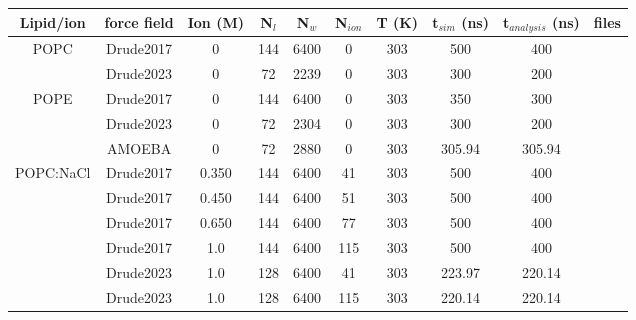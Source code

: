 \documentclass[journal=jacsat,manuscript=article,layout=singlecolumn]{achemso}
\begin{document}
\newpage
\begin{table}[]
\begin{small}
\begin{tabular}{cccccccccc}
	Lipid/ion                & force field  & Ion (M) & N$_{l}$ & N$_{w}$ & N$_{ion}$ & T (K) & t$_{sim}$ (ns) & t$_{analysis}$ (ns) & files \\ \hline
\multirow{2}{*}{POPC}            & Drude2017 & 0      & 144       & 6400       & 0         & 303    & 500              & 400         &          \cite{kav_batuhan_2021_7607436}    \\ 
                                 & Drude2023 & 0      & 72       & 2239       & 0         & 303      & 300              & 200         &          \cite{kav_batuhan_2023_7916287, richard_m_venable_2023_7871949}    \\ \hline
\multirow{3}{*}{POPE}                              & Drude2017 & 0      & 144       & 6400       & 0         & 303    & 350              & 300         &          \cite{kav_batuhan_2021_7604627}    \\                                            & Drude2023 & 0       & 72        & 2304      &  0         & 303    & 300             & 200         &           \cite{richard_m_venable_2023_7872447,kav_batuhan_2023_7916494} \\
                                                  & AMOEBA     & 0       & 72        & 2880      &  0        & 303     & 305.94          & 305.94      & \cite{kav_batuhan_2023_7622838} \\ \hline
	\multirow{5}{*}{POPC:NaCl}        & Drude2017 & 0.350   & 144      & 6400     & 41         & 303   & 500             & 400                  & \cite{kav_batuhan_2020_7586915}   \\
				  & Drude2017 & 0.450   & 144      & 6400     & 51         & 303   & 500             & 400                  & \cite{kav_batuhan_2020_7591753}   \\
				  & Drude2017 & 0.650   & 144      & 6400     & 77         & 303   & 500             & 400                  & \cite{kav_batuhan_2020_7596011}   \\
				  & Drude2017 & 1.0     & 144      & 6400     & 115        & 303   & 500             & 400                  & \cite{kav_batuhan_2020_7600326}   \\ 
                    & Drude2023 & 1.0      & 128       & 6400      & 41          & 303    & 223.97      &       220.14       & \cite{kav_batuhan_2023_8000095} \\     
                    & Drude2023 & 1.0      & 128       & 6400      & 115          & 303    & 220.14      &       220.14       & \cite{kav_batuhan_2023_8000133} \\ \hline
                    

\end{tabular}
\end{small}
\end{table}
\end{document}
